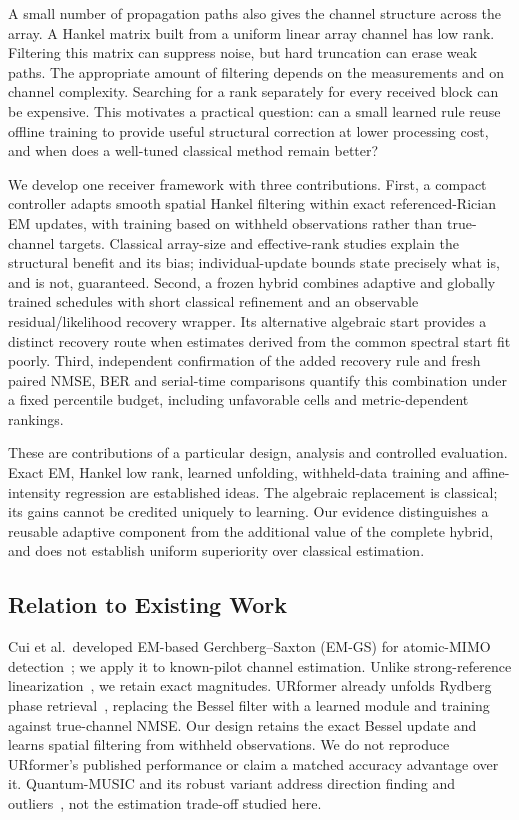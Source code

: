 \documentclass[10pt,journal,letterpaper]{IEEEtran}
\begin{document}
A small number of propagation paths also gives the channel structure across the array. A Hankel matrix built from a uniform linear array channel has low rank. Filtering this matrix can suppress noise, but hard truncation can erase weak paths. The appropriate amount of filtering depends on the measurements and on channel complexity. Searching for a rank separately for every received block can be expensive. This motivates a practical question: can a small learned rule reuse offline training to provide useful structural correction at lower processing cost, and when does a well-tuned classical method remain better?

We develop one receiver framework with three contributions. First, a compact controller adapts smooth spatial Hankel filtering within exact referenced-Rician EM updates, with training based on withheld observations rather than true-channel targets. Classical array-size and effective-rank studies explain the structural benefit and its bias; individual-update bounds state precisely what is, and is not, guaranteed. Second, a frozen hybrid combines adaptive and globally trained schedules with short classical refinement and an observable residual/likelihood recovery wrapper. Its alternative algebraic start provides a distinct recovery route when estimates derived from the common spectral start fit poorly. Third, independent confirmation of the added recovery rule and fresh paired NMSE, BER and serial-time comparisons quantify this combination under a fixed percentile budget, including unfavorable cells and metric-dependent rankings.

These are contributions of a particular design, analysis and controlled evaluation. Exact EM, Hankel low rank, learned unfolding, withheld-data training and affine-intensity regression are established ideas. The algebraic replacement is classical; its gains cannot be credited uniquely to learning. Our evidence distinguishes a reusable adaptive component from the additional value of the complete hybrid, and does not establish uniform superiority over classical estimation.

\subsection{Relation to Existing Work}
Cui et al.\ developed EM-based Gerchberg--Saxton (EM-GS) for atomic-MIMO detection~\cite{cui2025}; we apply it to known-pilot channel estimation. Unlike strong-reference linearization~\cite{xu2025}, we retain exact magnitudes. URformer already unfolds Rydberg phase retrieval~\cite{xiao2026}, replacing the Bessel filter with a learned module and training against true-channel NMSE. Our design retains the exact Bessel update and learns spatial filtering from withheld observations. We do not reproduce URformer's published performance or claim a matched accuracy advantage over it. Quantum-MUSIC and its robust variant address direction finding and outliers~\cite{kim2025quantummusic,banerjee2026robust}, not the estimation trade-off studied here.
\end{document}
